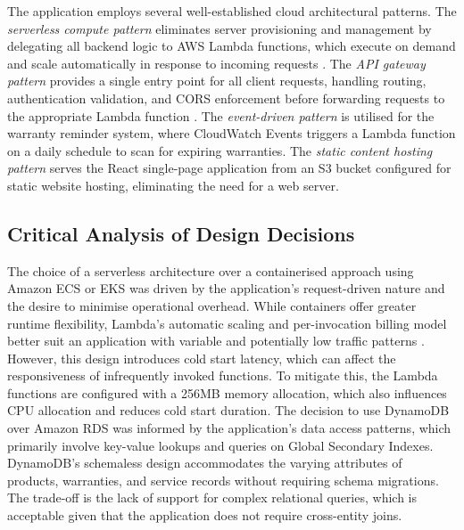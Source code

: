 \documentclass[conference]{IEEEtran}
\begin{document}
The application employs several well-established cloud architectural patterns. The \textit{serverless compute pattern} eliminates server provisioning and management by delegating all backend logic to AWS Lambda functions, which execute on demand and scale automatically in response to incoming requests \cite{jonas2019cloud}. The \textit{API gateway pattern} provides a single entry point for all client requests, handling routing, authentication validation, and CORS enforcement before forwarding requests to the appropriate Lambda function \cite{richardson2018microservices}. The \textit{event-driven pattern} is utilised for the warranty reminder system, where CloudWatch Events triggers a Lambda function on a daily schedule to scan for expiring warranties. The \textit{static content hosting pattern} serves the React single-page application from an S3 bucket configured for static website hosting, eliminating the need for a web server.

\subsection{Critical Analysis of Design Decisions}

The choice of a serverless architecture over a containerised approach using Amazon ECS or EKS was driven by the application's request-driven nature and the desire to minimise operational overhead. While containers offer greater runtime flexibility, Lambda's automatic scaling and per-invocation billing model better suit an application with variable and potentially low traffic patterns \cite{sbarski2017serverless}. However, this design introduces cold start latency, which can affect the responsiveness of infrequently invoked functions. To mitigate this, the Lambda functions are configured with a 256MB memory allocation, which also influences CPU allocation and reduces cold start duration. The decision to use DynamoDB over Amazon RDS was informed by the application's data access patterns, which primarily involve key-value lookups and queries on Global Secondary Indexes. DynamoDB's schemaless design accommodates the varying attributes of products, warranties, and service records without requiring schema migrations. The trade-off is the lack of support for complex relational queries, which is acceptable given that the application does not require cross-entity joins.

\end{document}
